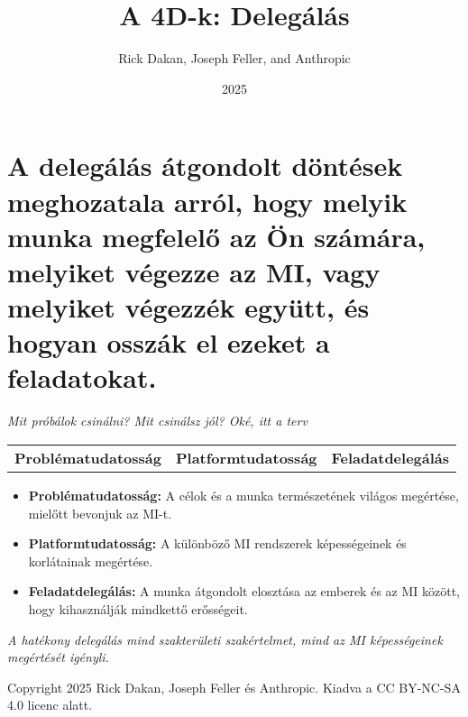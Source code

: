 \documentclass[a4paper, 12pt]{article}
\begin{document}
\title{A 4D-k: Delegálás}
\author{Rick Dakan, Joseph Feller, and Anthropic}
\date{2025}
\maketitle

\section*{A delegálás átgondolt döntések meghozatala arról, hogy melyik munka megfelelő az Ön számára, melyiket végezze az MI, vagy melyiket végezzék együtt, és hogyan osszák el ezeket a feladatokat.}
\textit{Mit próbálok csinálni? Mit csinálsz jól? Oké, itt a terv}

\begin{center}
\begin{tabular}{ccc}
\textbf{Problématudatosság} & \textbf{Platformtudatosság} & \textbf{Feladatdelegálás} \\
\end{tabular}
\end{center}

\begin{itemize}
    \item \textbf{Problématudatosság:} A célok és a munka természetének világos megértése, mielőtt bevonjuk az MI-t.
    \item \textbf{Platformtudatosság:} A különböző MI rendszerek képességeinek és korlátainak megértése.
    \item \textbf{Feladatdelegálás:} A munka átgondolt elosztása az emberek és az MI között, hogy kihasználják mindkettő erősségeit.
\end{itemize}

\textit{A hatékony delegálás mind szakterületi szakértelmet, mind az MI képességeinek megértését igényli.}

\vspace{\fill}
\begin{center}
    \small{Copyright 2025 Rick Dakan, Joseph Feller és Anthropic. Kiadva a CC BY-NC-SA 4.0 licenc alatt.}
\end{center}
\end{document}
